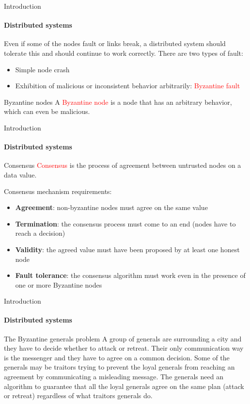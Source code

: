 \documentclass{beamer}
\newcommand\red[1]{\textcolor{red}{#1}}
\begin{document}
  \begin{frame}{Introduction}
    \framesubtitle{Distributed systems}
    Even if some of the nodes fault or links break, a distributed system should tolerate
    this and should continue to work correctly. There are two types of fault:
    \begin{itemize}
      \item Simple node crash
      \item Exhibition of malicious or inconsistent behavior arbitrarily: \red{Byzantine fault}
    \end{itemize}

    \begin{block}{Byzantine nodes}
      A \textcolor{red}{Byzantine node} is a node that has an arbitrary behavior,
      which can even be malicious.
    \end{block}
  \end{frame}




  \begin{frame}{Introduction}
    \framesubtitle{Distributed systems}
    \begin{block}{Consensus}
      \red{Consensus} is the process of agreement between untrusted nodes on a data
      value.
    \end{block}

    Consensus mechanism requirements:
    \begin{itemize}
      \item \textbf{Agreement}: non-byzantine nodes must agree on the same value
      \item \textbf{Termination}: the consensus process must come to an end (nodes
      have to reach a decision)
      \item \textbf{Validity}: the agreed value must have been proposed by at
      least one honest node
      \item \textbf{Fault tolerance}: the consensus algorithm must work even
      in the presence of one or more Byzantine nodes
    \end{itemize}
  \end{frame}



  \begin{frame}{Introduction}
    \framesubtitle{Distributed systems}
    \begin{block}{The Byzantine generals problem}
     A group of generals are surrounding a city and they have to decide
     whether to attack or retreat. Their only communication way
     is the messenger and they have to agree on a common decision.
     Some of the generals may be traitors trying to prevent the loyal generals
     from reaching an agreement by communicating a misleading message.
     The generals need an algorithm to guarantee that all the loyal generals agree on
     the same plan (attack or retreat) regardless of what traitors generals do.
    \end{block}
  \end{frame}
\end{document}
